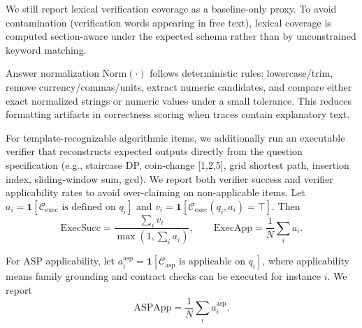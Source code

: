 \documentclass{article}
\begin{document}
We still report lexical verification coverage as a baseline-only proxy. To avoid contamination (verification words appearing in free text), lexical coverage is computed section-aware under the expected schema rather than by unconstrained keyword matching.

Answer normalization \(\mathrm{Norm}(\cdot)\) follows deterministic rules: lowercase/trim, remove currency/commas/units, extract numeric candidates, and compare either exact normalized strings or numeric values under a small tolerance. This reduces formatting artifacts in correctness scoring when traces contain explanatory text.

For template-recognizable algorithmic items, we additionally run an executable verifier that reconstructs expected outputs directly from the question specification (e.g., staircase DP, coin-change [1,2,5], grid shortest path, insertion index, sliding-window sum, gcd). We report both verifier success and verifier applicability rates to avoid over-claiming on non-applicable items.
Let \(a_i=\mathbf{1}[\mathcal{C}_{\text{exec}}\text{ is defined on }q_i]\) and \(v_i=\mathbf{1}[\mathcal{C}_{\text{exec}}(q_i,\hat a_i)=\top]\). Then
\begin{equation}
\label{eq:exec-metrics}
\mathrm{ExecSucc}=\frac{\sum_i v_i}{\max(1,\sum_i a_i)},\qquad
\mathrm{ExecApp}=\frac{1}{N}\sum_i a_i.
\end{equation}

For ASP applicability, let \(a_i^{\text{asp}}=\mathbf{1}[\mathcal{C}_{\text{asp}}\text{ is applicable on }q_i]\), where applicability means family grounding and contract checks can be executed for instance \(i\). We report
\begin{equation}
\label{eq:asp-app}
\mathrm{ASPApp}=\frac{1}{N}\sum_i a_i^{\text{asp}}.
\end{equation}
\end{document}
